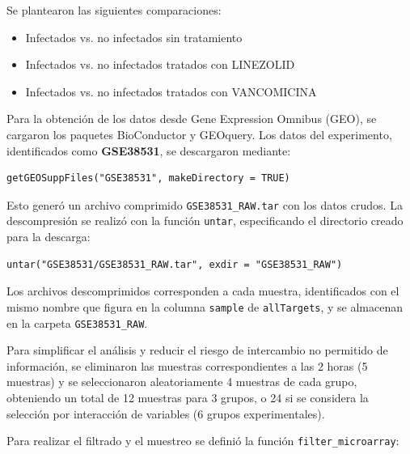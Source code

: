\documentclass[12pt,a4paper]{article}
\begin{document}
Se plantearon las siguientes comparaciones:

\begin{itemize}
  \item Infectados vs. no infectados sin tratamiento
  \item Infectados vs. no infectados tratados con LINEZOLID
  \item Infectados vs. no infectados tratados con VANCOMICINA
\end{itemize}

Para la obtención de los datos desde Gene Expression Omnibus (GEO), se cargaron los paquetes BioConductor y GEOquery. Los datos del experimento, identificados como \textbf{GSE38531}, se descargaron mediante:

\begin{verbatim}
getGEOSuppFiles("GSE38531", makeDirectory = TRUE)
\end{verbatim}

Esto generó un archivo comprimido \texttt{GSE38531\_RAW.tar} con los datos crudos. La descompresión se realizó con la función \texttt{untar}, especificando el directorio creado para la descarga:

\begin{verbatim}
untar("GSE38531/GSE38531_RAW.tar", exdir = "GSE38531_RAW")
\end{verbatim}

Los archivos descomprimidos corresponden a cada muestra, identificados con el mismo nombre que figura en la columna \texttt{sample} de \texttt{allTargets}, y se almacenan en la carpeta \texttt{GSE38531\_RAW}.

Para simplificar el análisis y reducir el riesgo de intercambio no permitido de información, se eliminaron las muestras correspondientes a las 2 horas (5 muestras) y se seleccionaron aleatoriamente 4 muestras de cada grupo, obteniendo un total de 12 muestras para 3 grupos, o 24 si se considera la selección por interacción de variables (6 grupos experimentales).  

Para realizar el filtrado y el muestreo se definió la función \texttt{filter\_microarray}:
\end{document}
